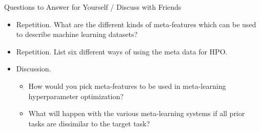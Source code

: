 \begin{frame}[c]{Questions to Answer for Yourself / Discuss with Friends}

\begin{itemize}
    \item \alert{Repetition.} What are the different kinds of meta-features which can be used to describe machine learning datasets?
    
    \medskip

    \item \alert{Repetition.} List six different ways of using the meta data for HPO.
    \medskip

    \item \alert{Discussion.}
    \begin{itemize}
        \item How would you pick meta-features to be used in meta-learning hyperparameter optimization?
        \item What will happen with the various meta-learning systems if all prior tasks are dissimilar to the target task?
    \end{itemize}


\end{itemize}

\end{frame}